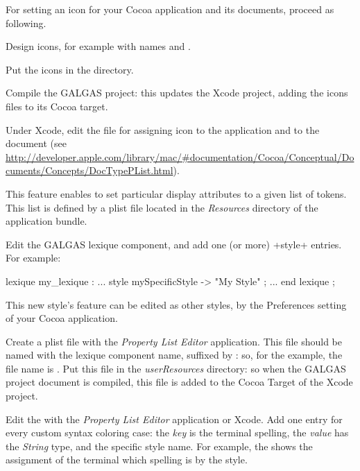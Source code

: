 For setting an icon for your Cocoa application and its documents, proceed as following.



 Design icons, for example with names  and .

 Put the icons in the  directory.

 Compile the GALGAS project: this updates the Xcode project, adding the icons files to its Cocoa target.

 Under Xcode, edit the  file for assigning icon to the application and to the document (see \url{http://developer.apple.com/library/mac/#documentation/Cocoa/Conceptual/Documents/Concepts/DocTypePList.html}).












This feature enables to set particular display attributes to a given list of tokens. This list is defined by a plist file located in the \emph{Resources} directory of the application bundle.

 Edit the GALGAS lexique component, and add one (or more) \ggs+style+ entries. For example:

\begin{galgas}
lexique my_lexique :
  ...
style mySpecificStyle -> "My Style" ;
  ...
end lexique ;
\end{galgas}

This new style's feature can be edited as other styles, by the Preferences setting of your Cocoa application.


 Create a plist file with the \emph{Property List Editor} application. This file should be named with the lexique component name, suffixed by : so, for the example, the file name is . Put this file in the \emph{userResources} directory: so when the GALGAS project document is compiled, this file is added to the Cocoa Target of the Xcode project. 

 Edit the  with the \emph{Property List Editor} application or Xcode. Add one entry for every custom syntax coloring case: the \emph{key} is the terminal spelling, the \emph{value} has the \emph{String} type, and the specific style name. For example, the  shows the assignment of the terminal which spelling is  by the  style.


